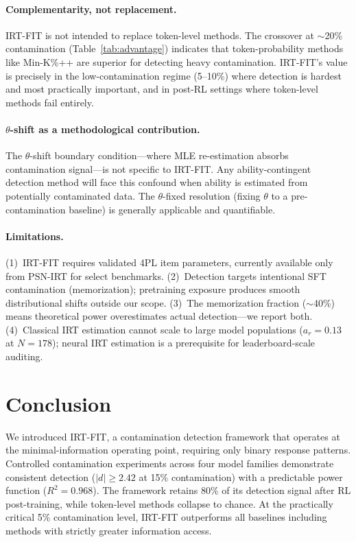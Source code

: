 \documentclass[11pt,a4paper]{article}
\newcommand{\thetafix}{$\theta$-fixed}
\begin{document}
\paragraph{Complementarity, not replacement.}
IRT-FIT is not intended to replace token-level methods.
The crossover at ${\sim}$20\% contamination (Table~\ref{tab:advantage}) indicates that token-probability methods like Min-K\%++ are superior for detecting heavy contamination.
IRT-FIT's value is precisely in the low-contamination regime (5--10\%) where detection is hardest and most practically important, and in post-RL settings where token-level methods fail entirely.

\paragraph{$\theta$-shift as a methodological contribution.}
The $\theta$-shift boundary condition---where MLE re-estimation absorbs contamination signal---is not specific to IRT-FIT.
Any ability-contingent detection method will face this confound when ability is estimated from potentially contaminated data.
The \thetafix{} resolution (fixing $\theta$ to a pre-contamination baseline) is generally applicable and quantifiable.

\paragraph{Limitations.}
(1)~IRT-FIT requires validated 4PL item parameters, currently available only from PSN-IRT for select benchmarks.
(2)~Detection targets intentional SFT contamination (memorization); pretraining exposure produces smooth distributional shifts outside our scope.
(3)~The memorization fraction (${\sim}$40\%) means theoretical power overestimates actual detection---we report both.
(4)~Classical IRT estimation cannot scale to large model populations ($a_r = 0.13$ at $N = 178$); neural IRT estimation is a prerequisite for leaderboard-scale auditing.

\section{Conclusion}
\label{sec:conclusion}

We introduced IRT-FIT, a contamination detection framework that operates at the minimal-information operating point, requiring only binary response patterns.
Controlled contamination experiments across four model families demonstrate consistent detection ($|d| \geq 2.42$ at 15\% contamination) with a predictable power function ($R^2 = 0.968$).
The framework retains 80\% of its detection signal after RL post-training, while token-level methods collapse to chance.
At the practically critical 5\% contamination level, IRT-FIT outperforms all baselines including methods with strictly greater information access.
\end{document}
